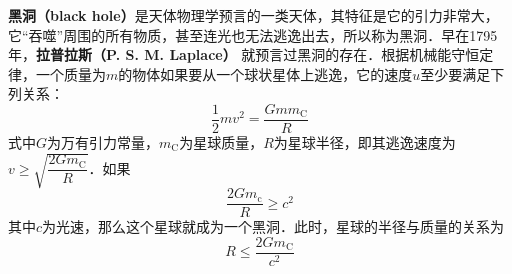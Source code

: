 

\textbf{黑洞（black hole）}是天体物理学预言的一类天体，其特征是它的引力非常大，它“吞噬”周围的所有物质，甚至连光也无法逃逸出去，所以称为黑洞．早在1795 年，\textbf{拉普拉斯（P. S. M. Laplace）} 就预言过黑洞的存在．根据机械能守恒定律，一个质量为$m$的物体如果要从一个球状星体上逃逸，它的速度$u $至少要满足下列关系：
\begin{equation}
\frac{1}{2} m v^{2}=\frac{G m m_{\mathrm{C}}}{R}
\end{equation}
式中$G $为万有引力常量，$ m_{\mathrm{C}}$为星球质量，$ R $为星球半径，即其逃逸速度为$v \geqslant \sqrt{\dfrac{2 G m_{\mathrm{C}}}{R}}$．如果
\begin{equation}
\frac{2 G m_{\mathrm{c}}}{R} \geqslant c^{2}
\end{equation}
其中$c$为光速，那么这个星球就成为一个黑洞．此时，星球的半径与质量的关系为
\begin{equation}
R \leqslant \frac{2 G m_{\mathrm{C}}}{c^{2}}
\end{equation}